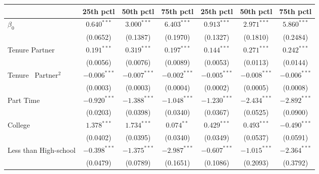 \begin{tabular}{l|ccc|ccc}
\toprule
{} &       25th pctl &       50th pctl &       75th pctl &              25th pctl &       50th pctl &       75th pctl \\
\midrule
$\beta_0$                     &   $0.640^{***}$ &   $3.000^{***}$ &   $6.403^{***}$ &          $0.913^{***}$ &   $2.971^{***}$ &   $5.860^{***}$ \\
                              &        (0.0652) &        (0.1387) &        (0.1970) &               (0.1327) &        (0.1810) &        (0.2484) \\
Tenure Partner                &   $0.191^{***}$ &   $0.319^{***}$ &   $0.197^{***}$ &          $0.144^{***}$ &   $0.271^{***}$ &   $0.242^{***}$ \\
                              &        (0.0056) &        (0.0076) &        (0.0089) &               (0.0053) &        (0.0113) &        (0.0144) \\
Tenure \ Partner$^{2}$        &  $-0.006^{***}$ &  $-0.007^{***}$ &  $-0.002^{***}$ &         $-0.005^{***}$ &  $-0.008^{***}$ &  $-0.006^{***}$ \\
                              &        (0.0003) &        (0.0003) &        (0.0004) &               (0.0002) &        (0.0005) &        (0.0008) \\
Part Time                     &  $-0.920^{***}$ &  $-1.388^{***}$ &  $-1.048^{***}$ &         $-1.230^{***}$ &  $-2.434^{***}$ &  $-2.892^{***}$ \\
                              &        (0.0203) &        (0.0398) &        (0.0340) &               (0.0367) &        (0.0525) &        (0.0900) \\
College                       &   $1.378^{***}$ &   $1.734^{***}$ &    $0.074^{**}$ &          $0.429^{***}$ &   $0.493^{***}$ &  $-0.490^{***}$ \\
                              &        (0.0402) &        (0.0395) &        (0.0340) &               (0.0349) &        (0.0537) &        (0.0591) \\
Less than High-school         &  $-0.398^{***}$ &  $-1.375^{***}$ &  $-2.987^{***}$ &         $-0.607^{***}$ &  $-1.015^{***}$ &  $-2.364^{***}$ \\
                              &        (0.0479) &        (0.0789) &        (0.1651) &               (0.1086) &        (0.2093) &        (0.3792) \\

\end{tabular}
